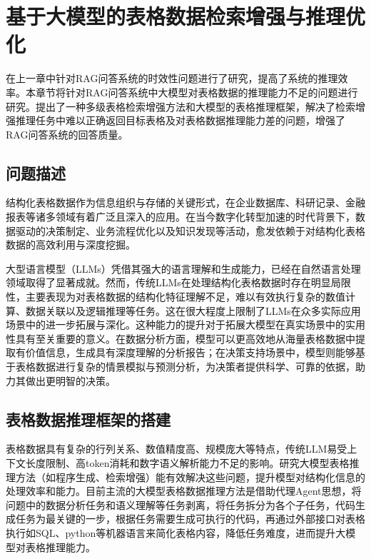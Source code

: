 \chapter{基于大模型的表格数据检索增强与推理优化}
\label{cha:第四章}
在上一章中针对RAG问答系统的时效性问题进行了研究，提高了系统的推理效率。本章节将针对RAG问答系统中大模型对表格数据的推理能力不足的问题进行研究。提出了一种多级表格检索增强方法和大模型的表格推理框架，解决了检索增强推理任务中难以正确返回目标表格及对表格数据推理能力差的问题，增强了RAG问答系统的回答质量。
\section{问题描述}
结构化表格数据作为信息组织与存储的关键形式，在企业数据库、科研记录、金融报表等诸多领域有着广泛且深入的应用。在当今数字化转型加速的时代背景下，数据驱动的决策制定、业务流程优化以及知识发现等活动，愈发依赖于对结构化表格数据的高效利用与深度挖掘。

大型语言模型（LLMs）凭借其强大的语言理解和生成能力，已经在自然语言处理领域取得了显著成就。然而，传统LLMs在处理结构化表格数据时存在明显局限性，主要表现为对表格数据的结构化特征理解不足，难以有效执行复杂的数值计算、数据关联以及逻辑推理等任务。这在很大程度上限制了LLMs在众多实际应用场景中的进一步拓展与深化。这种能力的提升对于拓展大模型在真实场景中的实用性具有至关重要的意义。在数据分析方面，模型可以更高效地从海量表格数据中提取有价值信息，生成具有深度理解的分析报告；在决策支持场景中，模型则能够基于表格数据进行复杂的情景模拟与预测分析，为决策者提供科学、可靠的依据，助力其做出更明智的决策。

\section{表格数据推理框架的搭建}
表格数据具有复杂的行列关系、数值精度高、规模庞大等特点，传统LLM易受上下文长度限制、高token消耗和数字语义解析能力不足的影响。研究大模型表格推理方法（如程序生成、检索增强）能有效解决这些问题，提升模型对结构化信息的处理效率和能力。目前主流的大模型表格数据推理方法是借助代理Agent思想，将问题中的数据分析任务和语义理解等任务剥离，将任务拆分为各个子任务，代码生成任务为最关键的一步，根据任务需要生成可执行的代码，再通过外部接口对表格执行如SQL、python等机器语言来简化表格内容，降低任务难度，进而提升大模型对表格推理能力。

